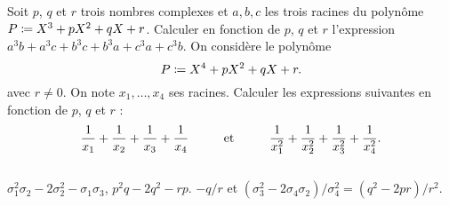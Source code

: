 \documentclass{magnolia}
\begin{document}
\begin{questions}
\question Soit $p$, $q$ et $r$ trois nombres complexes et $a,b,c$ les trois
racines du polynôme $P\coloneqq X^3+pX^2+qX+r$. Calculer en fonction de $p$, $q$ et
$r$ l'expression $a^3b+a^3c+b^3c+b^3a+c^3a+c^3b$.
\question On considère le polynôme
  $$P\coloneqq X^4+pX^2+qX+r.$$
  avec $r\not=0$. On note $x_1,\ldots,x_4$ ses racines. Calculer les
  expressions suivantes en fonction de $p$, $q$ et $r$ :
  $$\frac{1}{x_1}+\frac{1}{x_2}+\frac{1}{x_3}+\frac{1}{x_4} \qquad\quad\!\text{et}\quad\!\qquad  \frac{1}{x_1^2}+\frac{1}{x_2^2}+\frac{1}{x_3^2}+\frac{1}{x_4^2}.$$
\end{questions}
\begin{sol}
$\quad$
\begin{questions}
\question $\sigma_1^2\sigma_2-2\sigma_2^2-\sigma_1\sigma_3$, $p^2q-2q^2-rp$.
\question $-q/r$ et $(\sigma_3^2-2\sigma_4\sigma_2)/\sigma_4^2=(q^2-2pr)/r^2$.
\end{questions}
\end{sol}


\end{document}
